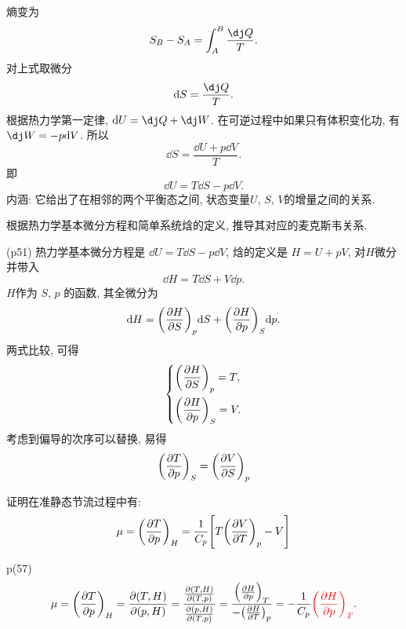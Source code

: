 \begin{questions}
\begin{solution}
    熵变为
    \begin{equation}
      S_B - S_A = \int_A^B \frac{\dj Q}{T}.
    \end{equation}
    对上式取微分
    \begin{equation}
      \dd S = \frac{\dj Q}{T}.
    \end{equation}
    根据热力学第一定律, $\dd U = \dj Q + \dj W$. 在可逆过程中如果只有体积变化功, 有 $\dj W = -p\dd V$. 所以
    \begin{equation}
      \dd S = \frac{\dd U + p\dd V}{T}.
    \end{equation}
    即
    \begin{equation}
      \dd U = T\dd S - p\dd V.
    \end{equation}
    内涵: 它给出了在相邻的两个平衡态之间, 状态变量$U$, $S$, $V$的增量之间的关系.
  \end{solution}
  \question 根据热力学基本微分方程和简单系统焓的定义, 推导其对应的麦克斯韦关系.
  \begin{solution}
    (p51) 热力学基本微分方程是 $\dd U = T\dd S - p\dd V$, 焓的定义是 $H = U + pV$, 对$H$微分并带入
    \begin{equation}
      \dd H = T\dd S + V\dd p.
    \end{equation}
    $H$作为 $S$, $p$ 的函数, 其全微分为
    \begin{equation}
      \dd H = \qty(\pdv{H}{S})_p\dd S + \qty(\pdv{H}{p})_S\dd p.
    \end{equation}
    两式比较, 可得
    \begin{equation}
      \left\{\begin{aligned}
         & \qty(\pdv{H}{S})_p = T, \\
         & \qty(\pdv{H}{p})_S = V.
      \end{aligned}\right.
    \end{equation}
    考虑到偏导的次序可以替换, 易得
    \begin{equation}
      \qty(\pdv{T}{p})_S = \qty(\pdv{V}{S})_p
    \end{equation}
  \end{solution}
  \question 证明在准静态节流过程中有:
  \begin{equation}
    \mu = \qty(\pdv{T}{p})_H = \frac{1}{C_p}\qty[T\qty(\pdv{V}{T})_p - V]
  \end{equation}
  \begin{solution}
    p(57)
    \begin{equation}
      \mu = \qty(\pdv{T}{p})_H = \pdv{(T,H)}{(p,H)} = \frac{\pdv{(T,H)}{(T,p)}}{\pdv{(p,H)}{(T,p)}} = \frac{\qty(\pdv{H}{p})_T}{-\qty(\pdv{H}{T})_p} = -\frac{1}{C_p}{\color{red}\qty(\pdv{H}{p})_T}.

\end{equation}
\end{solution}
\end{questions}
